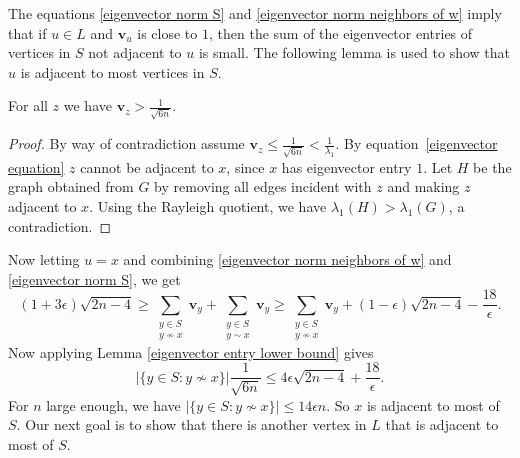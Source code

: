  
 The equations \eqref{eigenvector norm S} and \eqref{eigenvector norm neighbors of w} imply that if $u\in L$ and $\mathbf{v}_u$ is close to $1$, then the sum of the eigenvector entries of vertices in $S$ not adjacent to $u$ is small. The following lemma is used to show that $u$ is adjacent to most vertices in $S$.
 
\begin{lemma}\label{eigenvector entry lower bound}
For all $z$ we have $\mathbf{v}_z>\frac{1}{\sqrt{6n}}$.
\end{lemma}
\begin{proof}
  By way of contradiction assume $\mathbf{v}_z\leq \frac{1}{\sqrt{6n}} < \frac{1}{\lambda_1}$. By
  equation~\eqref{eigenvector equation} $z$ cannot be adjacent to $x$, since
  $x$ has eigenvector entry $1$. Let $H$ be the graph obtained from $G$ by removing all edges incident with $z$ and making $z$ adjacent to $x$. Using the Rayleigh quotient, we have $\lambda_1(H) > \lambda_1(G)$, a contradiction.
\end{proof}

\noindent Now letting $u=x$ and combining \eqref{eigenvector norm neighbors of w} and \eqref{eigenvector norm S}, we get 
\[
(1+3\epsilon)\sqrt{2n-4} \geq \sum_{\substack{y\in S\\ y\not\sim x}} \mathbf{v}_y + \sum_{\substack{y\in S\\ y\sim x}} \mathbf{v}_y \geq \sum_{\substack{y\in S\\ y\not\sim x}} \mathbf{v}_y + (1-\epsilon)\sqrt{2n-4} - \frac{18}{\epsilon}.
\]
Now applying Lemma \ref{eigenvector entry lower bound} gives
\[
|\{y\in S: y\not\sim x\}| \frac{1}{\sqrt{6n} }\leq 4\epsilon \sqrt{2n-4} + \frac{18}{\epsilon}.
\]
For $n$ large enough, we have $|\{y\in S: y\not\sim x\}| \leq 14\epsilon n$. So $x$ is adjacent to most of $S$. Our next goal is to show that there is another vertex in $L$ that is adjacent to most of $S$.

